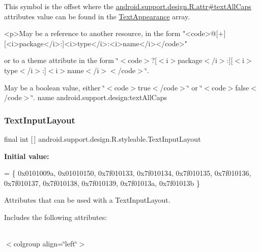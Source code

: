 This symbol is the offset where the \hyperlink{classandroid_1_1support_1_1design_1_1R_1_1attr_ab79e12973dd7b26f7ad9ef87ae44ecfa}{android.\+support.\+design.\+R.\+attr\#text\+All\+Caps} attribute\textquotesingle{}s value can be found in the \hyperlink{classandroid_1_1support_1_1design_1_1R_1_1styleable_a23dc46ec989f92f528b46568dad7e726}{Text\+Appearance} array.

\begin{DoxyVerb}      <p>May be a reference to another resource, in the form "<code>@[+][<i>package</i>:]<i>type</i>:<i>name</i></code>"
\end{DoxyVerb}
 or to a theme attribute in the form \char`\"{}$<$code$>$?\mbox{[}$<$i$>$package$<$/i$>$\+:\mbox{]}\mbox{[}$<$i$>$type$<$/i$>$\+:\mbox{]}$<$i$>$name$<$/i$>$$<$/code$>$\char`\"{}. 

May be a boolean value, either \char`\"{}$<$code$>$true$<$/code$>$\char`\"{} or \char`\"{}$<$code$>$false$<$/code$>$\char`\"{}.  name android.\+support.\+design\+:text\+All\+Caps \mbox{\label{classandroid_1_1support_1_1design_1_1R_1_1styleable_ae01fd2fce65dc8639f3898586b0cedcf}} 
\subsubsection{\texorpdfstring{Text\+Input\+Layout}{TextInputLayout}}
{\footnotesize\ttfamily final int \mbox{[}$\,$\mbox{]} android.\+support.\+design.\+R.\+styleable.\+Text\+Input\+Layout\hspace{0.3cm}{\ttfamily [static]}}

{\bfseries Initial value\+:}
\begin{DoxyCode}
= \{
            0x0101009a, 0x01010150, 0x7f010133, 0x7f010134,
            0x7f010135, 0x7f010136, 0x7f010137, 0x7f010138,
            0x7f010139, 0x7f01013a, 0x7f01013b
        \}
\end{DoxyCode}
Attributes that can be used with a Text\+Input\+Layout. 

Includes the following attributes\+:

\tabulinesep=1mm
\begin{longtabu} spread 0pt [c]{*{0}{|X[-1]}|}
\hline
\end{longtabu}
$<$colgroup align=\char`\"{}left\char`\"{}$>$ 

